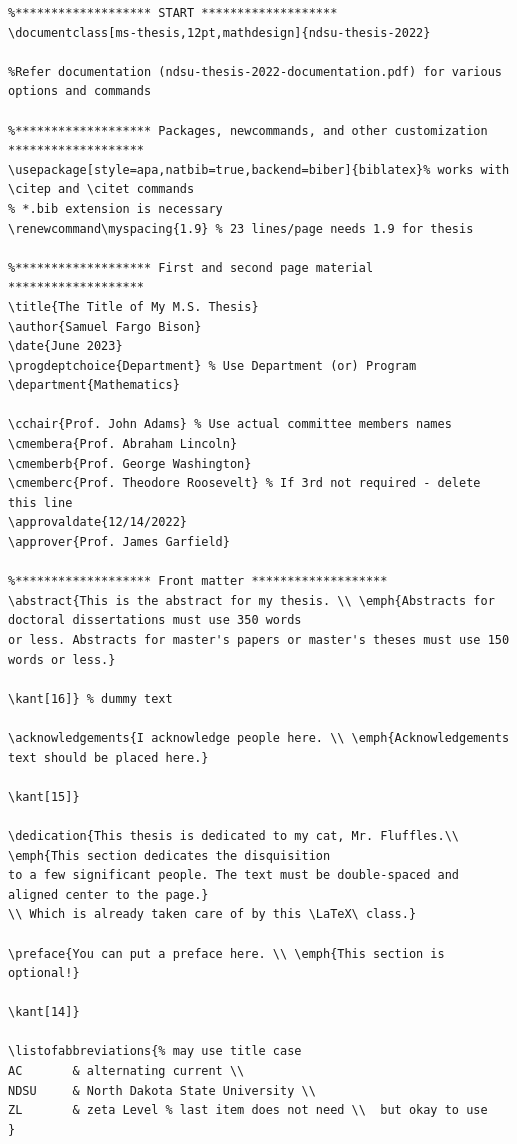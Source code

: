 \documentclass{article}
\begin{document}
{\scriptsize
\begin{verbatim}
%******************* START *******************
\documentclass[ms-thesis,12pt,mathdesign]{ndsu-thesis-2022}

%Refer documentation (ndsu-thesis-2022-documentation.pdf) for various options and commands

%******************* Packages, newcommands, and other customization *******************
\usepackage[style=apa,natbib=true,backend=biber]{biblatex}% works with \citep and \citet commands
% *.bib extension is necessary 
\renewcommand\myspacing{1.9} % 23 lines/page needs 1.9 for thesis

%******************* First and second page material *******************
\title{The Title of My M.S. Thesis}
\author{Samuel Fargo Bison}
\date{June 2023}
\progdeptchoice{Department} % Use Department (or) Program
\department{Mathematics}

\cchair{Prof. John Adams} % Use actual committee members names 
\cmembera{Prof. Abraham Lincoln}
\cmemberb{Prof. George Washington}
\cmemberc{Prof. Theodore Roosevelt} % If 3rd not required - delete this line 
\approvaldate{12/14/2022}
\approver{Prof. James Garfield}

%******************* Front matter *******************
\abstract{This is the abstract for my thesis. \\ \emph{Abstracts for doctoral dissertations must use 350 words 
or less. Abstracts for master's papers or master's theses must use 150 words or less.}

\kant[16]} % dummy text

\acknowledgements{I acknowledge people here. \\ \emph{Acknowledgements text should be placed here.} 

\kant[15]}

\dedication{This thesis is dedicated to my cat, Mr. Fluffles.\\ \emph{This section dedicates the disquisition
to a few significant people. The text must be double-spaced and aligned center to the page.} 
\\ Which is already taken care of by this \LaTeX\ class.}

\preface{You can put a preface here. \\ \emph{This section is optional!} 

\kant[14]}

\listofabbreviations{% may use title case
AC       & alternating current \\
NDSU     & North Dakota State University \\
ZL       & zeta Level % last item does not need \\  but okay to use
}


\end{verbatim}}
\end{document}
